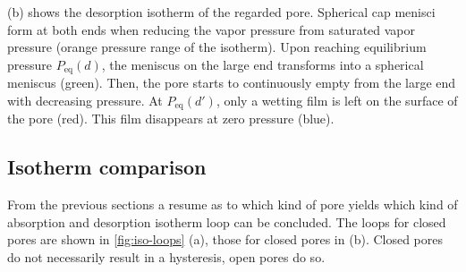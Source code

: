 \documentclass[../thesis.tex]{subfiles}
\begin{document}
                 (b) shows the desorption isotherm of the regarded pore. Spherical cap menisci form at both ends when reducing the vapor pressure from saturated vapor pressure (orange pressure range of the isotherm). Upon reaching equilibrium pressure $P_\mathrm{eq}(d)$, the meniscus on the large end transforms into a spherical meniscus (green). Then, the pore starts to continuously empty from the large end with decreasing pressure. At $P_\mathrm{eq}(d')$, only a wetting film is left on the surface of the pore (red). This film disappears at zero pressure (blue).

            

        \subsection{Isotherm comparison}

            From the previous sections a resume as to which kind of pore yields which kind of absorption and desorption isotherm loop can be concluded. The loops for closed pores are  shown in \cref{fig:iso-loops} (a),  those for closed pores in (b). Closed pores do not necessarily result in a hysteresis, open pores do so.
\end{document}

